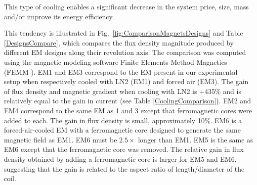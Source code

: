   This type of cooling enables a significant decrease in the system price, size, mass and/or improve its energy efficiency. \par
  This tendency is illustrated in Fig.~\ref{fig:ComparisonMagnetsDesigns} and Table \ref{DesignsCompare}, which compares the flux density magnitude produced by different EM designs along their revolution axis. 
 The comparison was computed using the magnetic modeling software Finite Elements Method Magnetics (FEMM \cite{meeker2010finite}).
 EM1 and EM3 correspond to the EM present in our experimental setup when respectively cooled with LN2 (EM1) and forced air (EM3).  
 The gain of flux density and magnetic gradient when cooling with LN2 is +435\% and is relatively equal to the gain in current (see Table \ref{CoolingComparison}). 
 EM2 and EM4 correspond to the same EM as 1 and 3 except that ferromagnetic cores were added to each. 
 The gain in flux density is small, approximately 10\%. 
 EM6 is a forced-air-cooled EM with a ferromagnetic core designed to generate the same magnetic field as EM1.  
  EM6 must be $2.5\times$ longer than EM1. 
  EM5 is the same as EM6 except that the ferromagnetic core was removed. 
  The relative gain in flux density obtained by adding a ferromagnetic core is larger for EM5 and EM6, suggesting that the gain is related to the aspect ratio of length/diameter of the coil.




